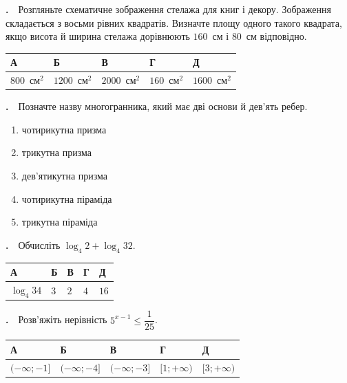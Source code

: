\documentclass[12pt]{article}
\newcommand{\answerTable}[5]{%
\par\vspace{0.15cm}
\noindent
\begin{tabular}{|*{5}{>{\centering\arraybackslash}m{3cm}|}}
\hline
\rule[-0.15cm]{0pt}{0.6cm}\textbf{А} & \rule[-0.15cm]{0pt}{0.6cm}\textbf{Б} & \rule[-0.15cm]{0pt}{0.6cm}\textbf{В} & \rule[-0.15cm]{0pt}{0.6cm}\textbf{Г} & \rule[-0.15cm]{0pt}{0.6cm}\textbf{Д} \\
\hline
\rule[-0.2cm]{0pt}{0.75cm}#1 & \rule[-0.2cm]{0pt}{0.75cm}#2 & \rule[-0.2cm]{0pt}{0.75cm}#3 & \rule[-0.2cm]{0pt}{0.75cm}#4 & \rule[-0.2cm]{0pt}{0.75cm}#5 \\
\hline
\end{tabular}
\par\vspace{0.25cm}
}
\newcounter{zad}
\newcommand{\zadtask}[1]{\stepcounter{zad}\par\vspace{0.3cm}\noindent\textbf{\thezad.}\ \ #1\par\vspace{0.2cm}}
\newcommand{\zadnum}{\stepcounter{zad}\noindent\textbf{\thezad.}\ \ }
\begin{document}
\noindent
\begin{minipage}[c]{0.60\textwidth}
\zadnum Розгляньте схематичне зображення стелажа для книг і декору. Зображення складається з восьми рівних квадратів. Визначте площу одного такого квадрата, якщо висота й ширина стелажа дорівнюють $160$~см і $80$~см відповідно.
\end{minipage}%
\hfill
\begin{minipage}[c]{0.38\textwidth}
\centering
{}
\end{minipage}
\par\vspace{0.2cm}
\answerTable{$800$~см$^2$}{$1200$~см$^2$}{$2000$~см$^2$}{$160$~см$^2$}{$1600$~см$^2$}

\zadtask{Позначте назву многогранника, який має дві основи й дев'ять ребер.
\vspace{0.1cm}
\begin{enumerate}[label=\textbf{\Alph*}, leftmargin=2.8em, itemsep=0.1cm]
    \item чотирикутна призма
    \item трикутна призма
    \item дев'ятикутна призма
    \item чотирикутна піраміда
    \item трикутна піраміда
\end{enumerate}
\vspace{0.1cm}}

\zadtask{Обчисліть $\log_4 2 + \log_4 32$.}
\answerTable{$\log_4 34$}{$3$}{$2$}{$4$}{$16$}

\zadtask{Розв'яжіть нерівність $5^{x-1} \leqslant \dfrac{1}{25}$.}
\answerTable{$(-\infty; -1]$}{$(-\infty; -4]$}{$(-\infty; -3]$}{$[1; +\infty)$}{$[3; +\infty)$}
\end{document}
